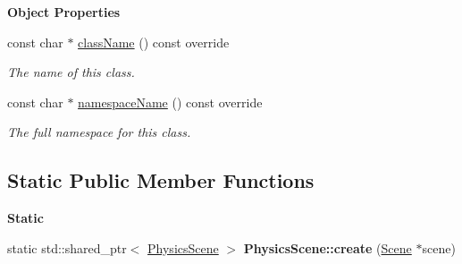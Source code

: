 \begin{Indent}\textbf{ Object Properties}\par
\begin{DoxyCompactItemize}
\item 
const char $\ast$ \mbox{\hyperlink{classrev_1_1_physics_scene_a7ea458478b0e1e2db563854807a66f8b}{class\+Name}} () const override
\begin{DoxyCompactList}\small\item\em The name of this class. \end{DoxyCompactList}\item 
const char $\ast$ \mbox{\hyperlink{classrev_1_1_physics_scene_ab8d105fd9f30fa787cf4776afcd3a864}{namespace\+Name}} () const override
\begin{DoxyCompactList}\small\item\em The full namespace for this class. \end{DoxyCompactList}\end{DoxyCompactItemize}
\end{Indent}
\subsection*{Static Public Member Functions}
\begin{Indent}\textbf{ Static}\par
\begin{DoxyCompactItemize}
\item 
\mbox{\label{classrev_1_1_physics_scene_ac69cb117fae4f72be26da17fe52ca7f4}} 
static std\+::shared\+\_\+ptr$<$ \mbox{\hyperlink{classrev_1_1_physics_scene}{Physics\+Scene}} $>$ {\bfseries Physics\+Scene\+::create} (\mbox{\hyperlink{classrev_1_1_scene}{Scene}} $\ast$scene)
\end{DoxyCompactItemize}
\end{Indent}
